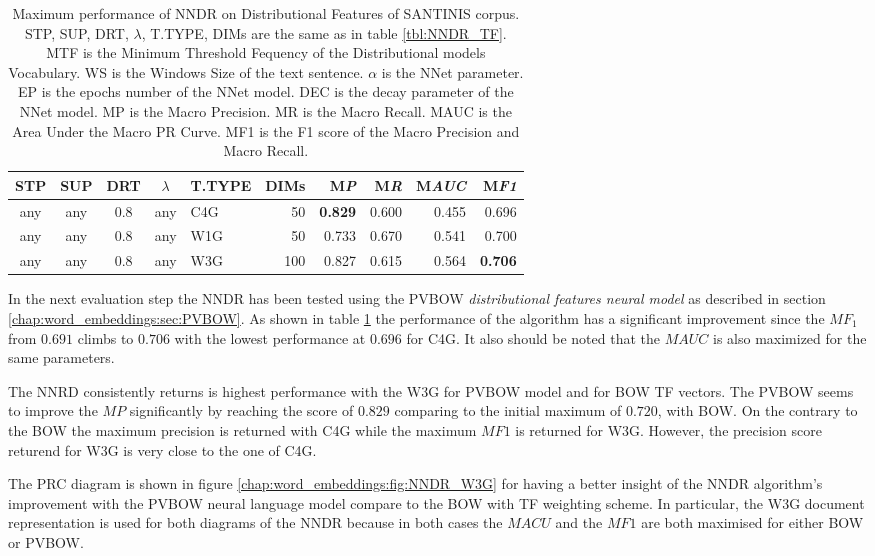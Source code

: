 \begin{table}
\center
\begin{tabular}{cccclrrrrr}
\hline
STP & SUP & DRT & $\lambda$ & T.TYPE & DIMs & M\emph{P} & M\emph{R} & M\emph{AUC} & M\emph{F1} \\
\hline
any & any & 0.8 & any & C4G & 50 & \textbf{0.829} & 0.600 & 0.455 & 0.696 \\
any & any & 0.8 & any & W1G & 50 & 0.733 & 0.670 & 0.541 & 0.700 \\
any & any & 0.8 & any & W3G & 100 & 0.827 & 0.615 & 0.564 & \textbf{0.706} \\
\hline
\end{tabular}
\caption {Maximum performance of NNDR on Distributional Features of SANTINIS corpus. STP, SUP, DRT, $\lambda$, T.TYPE, DIMs are the same as in table \ref{tbl:NNDR_TF}. MTF is the Minimum Threshold Fequency of the Distributional models Vocabulary. WS is the Windows Size of the text sentence. $\alpha$ is the NNet parameter. EP is the epochs number of the NNet model. DEC is the decay parameter of the NNet model. MP is the Macro Precision. MR is the Macro Recall. MAUC is the Area Under the Macro PR Curve. MF1 is the F1 score of the Macro Precision and Macro Recall.}
\label{chap:word_embeddings:tbl:NNDR_PVBOW}
\end{table}

In the next evaluation step the NNDR has been tested using the PVBOW \textit{distributional features neural model }as described in section \ref{chap:word_embeddings:sec:PVBOW}. As shown in table \ref{chap:word_embeddings:tbl:NNDR_PVBOW} the performance of the algorithm has a significant improvement since the  $MF_{1}$ from $0.691$ climbs to $0.706$ with the lowest performance at $0.696$ for C4G. It also should be noted that the $MAUC$ is also maximized for the same parameters. 

The NNRD consistently returns is highest performance with the W3G for PVBOW model and for BOW TF vectors. The PVBOW seems to improve the $MP$ significantly by reaching the score of $0.829$ comparing to the initial maximum of $0.720$, with BOW. On the contrary to the BOW the maximum precision is returned with C4G while the maximum $MF1$ is returned for W3G. However, the precision score returend for W3G is very close to the one of C4G.

The PRC diagram is shown in figure  \ref{chap:word_embeddings:fig:NNDR_W3G} for having a better insight of the NNDR algorithm's improvement with the PVBOW neural language model compare to the BOW with TF weighting scheme. In particular, the W3G document representation is used for both diagrams of the NNDR because in both cases the $MACU$ and the $MF1$ are both maximised for either BOW or PVBOW.

